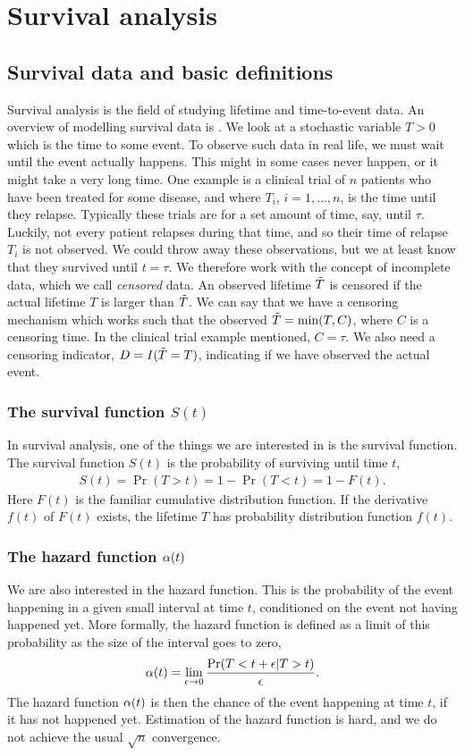 \chapter{Survival analysis}

\section{Survival data and basic definitions}
Survival analysis is the field of studying lifetime and time-to-event data. An overview of modelling survival data is \citet{ABG}. We look at a stochastic variable $T>0$ which is the time to some event. To observe such data in real life, we must wait until the event actually happens. This might in some cases never happen, or it might take a very long time. One example is a clinical trial of $n$ patients who have been treated for some disease, and where $T_i$, $i=1,\ldots,n$, is the time until they relapse. Typically these trials are for a set amount of time, say, until $\tau$. Luckily, not every patient relapses during that time, and so their time of relapse $T_i$ is not observed. We could throw away these observations, but we at least know that they survived until $t=\tau$. We therefore work with the concept of incomplete data, which we call \textit{censored} data. An observed lifetime $\tilde{T}$ is censored if the actual lifetime $T$ is larger than $\tilde{T}$. We can say that we have a censoring mechanism which works such that the observed $\tilde{T}=\min(T, C)$, where $C$ is a censoring time. In the clinical trial example mentioned, $C=\tau$. We also need a censoring indicator, $D=I(\tilde{T}=T)$, indicating if we have observed the actual event.

\subsection{The survival function $S(t)$}
In survival analysis, one of the things we are interested in is the survival function. The survival function $S(t)$ is the probability of surviving until time $t$,
\begin{align*}
    S(t)=\Pr(T>t)=1-\Pr(T<t)=1-F(t).
\end{align*}
Here $F(t)$ is the familiar cumulative distribution function. If the derivative $f(t)$ of $F(t)$ exists, the lifetime $T$ has probability distribution function $f(t)$.

\subsection{The hazard function $\alpha(t)$}
We are also interested in the hazard function. This is the probability of the event happening in a given small interval at time $t$, conditioned on the event not having happened yet. More formally, the hazard function is defined as a limit of this probability as the size of the interval goes to zero,
\begin{equation*}
    \alpha(t)=\lim_{\epsilon\to0}\frac{\Pr(T<t+\epsilon|T>t)}{\epsilon}.
\end{equation*}
The hazard function $\alpha(t)$ is then the chance of the event happening at time $t$, if it has not happened yet. Estimation of the hazard function is hard, and we do not achieve the usual $\sqrt{n}$ convergence.

